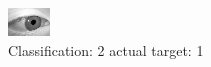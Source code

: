 \begin{figure}[h!]
\begin{center}
\includegraphics[width=0.60\columnwidth]{figures/ID2769_class_2_target_1.png}
\end{center}
\caption{ Classification: 2 actual target: 1}
\label{fig:ID2769_class_2_target_1}
\end{figure}
